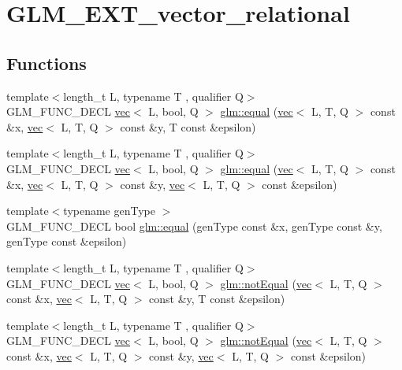 \hypertarget{group__ext__vector__relational}{}\section{G\+L\+M\+\_\+\+E\+X\+T\+\_\+vector\+\_\+relational}
\label{group__ext__vector__relational}
\subsection*{Functions}
\begin{DoxyCompactItemize}
\item 
{\footnotesize template$<$length\+\_\+t L, typename T , qualifier Q$>$ }\\G\+L\+M\+\_\+\+F\+U\+N\+C\+\_\+\+D\+E\+CL \hyperlink{structglm_1_1vec}{vec}$<$ L, bool, Q $>$ \hyperlink{group__ext__vector__relational_gae630b1f87fbd3b762ca46b0b8b32b02e}{glm\+::equal} (\hyperlink{structglm_1_1vec}{vec}$<$ L, T, Q $>$ const \&x, \hyperlink{structglm_1_1vec}{vec}$<$ L, T, Q $>$ const \&y, T const \&epsilon)
\item 
{\footnotesize template$<$length\+\_\+t L, typename T , qualifier Q$>$ }\\G\+L\+M\+\_\+\+F\+U\+N\+C\+\_\+\+D\+E\+CL \hyperlink{structglm_1_1vec}{vec}$<$ L, bool, Q $>$ \hyperlink{group__ext__vector__relational_ga6fb2432528edd028e3c2cf5b78d99797}{glm\+::equal} (\hyperlink{structglm_1_1vec}{vec}$<$ L, T, Q $>$ const \&x, \hyperlink{structglm_1_1vec}{vec}$<$ L, T, Q $>$ const \&y, \hyperlink{structglm_1_1vec}{vec}$<$ L, T, Q $>$ const \&epsilon)
\item 
{\footnotesize template$<$typename gen\+Type $>$ }\\G\+L\+M\+\_\+\+F\+U\+N\+C\+\_\+\+D\+E\+CL bool \hyperlink{group__ext__vector__relational_gac4ae021e79693174e4de6560d159b33a}{glm\+::equal} (gen\+Type const \&x, gen\+Type const \&y, gen\+Type const \&epsilon)
\item 
{\footnotesize template$<$length\+\_\+t L, typename T , qualifier Q$>$ }\\G\+L\+M\+\_\+\+F\+U\+N\+C\+\_\+\+D\+E\+CL \hyperlink{structglm_1_1vec}{vec}$<$ L, bool, Q $>$ \hyperlink{group__ext__vector__relational_ga59a03a51402b6e1ce80f9a3b436f17bd}{glm\+::not\+Equal} (\hyperlink{structglm_1_1vec}{vec}$<$ L, T, Q $>$ const \&x, \hyperlink{structglm_1_1vec}{vec}$<$ L, T, Q $>$ const \&y, T const \&epsilon)
\item 
{\footnotesize template$<$length\+\_\+t L, typename T , qualifier Q$>$ }\\G\+L\+M\+\_\+\+F\+U\+N\+C\+\_\+\+D\+E\+CL \hyperlink{structglm_1_1vec}{vec}$<$ L, bool, Q $>$ \hyperlink{group__ext__vector__relational_ga0497a636e5e8140bb7ebc021baf86637}{glm\+::not\+Equal} (\hyperlink{structglm_1_1vec}{vec}$<$ L, T, Q $>$ const \&x, \hyperlink{structglm_1_1vec}{vec}$<$ L, T, Q $>$ const \&y, \hyperlink{structglm_1_1vec}{vec}$<$ L, T, Q $>$ const \&epsilon)

\end{DoxyCompactItemize}

